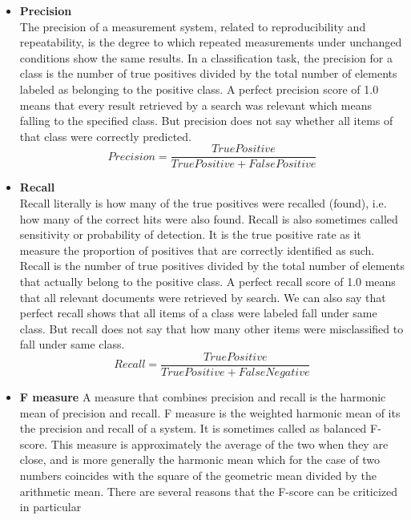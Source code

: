 {\begin{itemize}
        \item \textbf{Precision}\\
                The precision of a measurement system, related to reproducibility and repeatability, is the degree to which repeated measurements under unchanged
                conditions show the same results. In a classification task, the precision for a class is the number of true positives divided by the total number of elements labeled as 
                belonging to the positive class. A perfect precision score of 1.0 means that every result retrieved by a search was relevant which means falling to the specified class.
                But precision does not say whether all items of that class were correctly predicted.
                \begin{equation}
                        Precision = \frac{True Positive}{True Positive + False Positive}
                \end{equation}
        \item \textbf{Recall}\\
                Recall literally is how many of the true positives were recalled (found), i.e. how many of the correct hits were also found. Recall is also sometimes called sensitivity or probability of detection.
                It is the true positive rate as it measure the proportion of positives that are correctly identified as such. Recall is the number of true positives divided by the total number of elements
                that actually belong to the positive class. A perfect recall score of 1.0 means that all relevant documents were retrieved by search. We can also say that perfect recall shows that all items of a
                class were labeled fall under same class. But recall does not say that how many other items were misclassified to fall under same class.
                \begin{equation}
                        Recall = \frac{True Positive}{True Positive + False Negative}
                \end{equation}
        \item \textbf{F measure}
               A measure that combines precision and recall is the harmonic mean of precision and recall. 
                F measure is the weighted harmonic mean of its the precision and recall of a system. It is sometimes called as balanced F-score. This measure is approximately the average of the two when they are close, and is more generally
                the harmonic mean which for the case of two numbers coincides with the square of the geometric mean divided by the arithmetic mean. There are several reasons that the F-score can be criticized in particular 

\end{itemize}}
